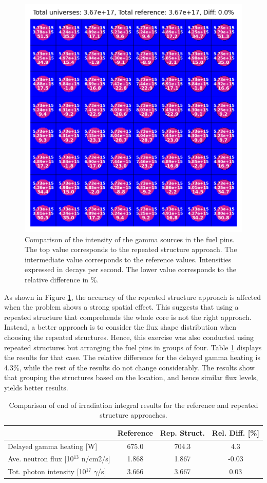 \begin{figure}[htbp!] %
    \centering
    \includegraphics[width=0.75\linewidth]{figures/moaa-ref-uni-gamma-intens-b}
    \hfill
    \caption{Comparison of the intensity of the gamma sources in the fuel pins. The top value corresponds to the repeated structure approach. The intermediate value corresponds to the reference values. Intensities expressed in decays per second. The lower value corresponds to the relative difference in \%.}
    \label{fig:gamma-sources}
\end{figure}

As shown in Figure \ref{fig:gamma-sources}, the accuracy of the repeated structure approach is affected when the problem shows a strong spatial effect.
This suggests that using a repeated structure that comprehends the whole core is not the right approach.
Instead, a better approach is to consider the flux shape distribution when choosing the repeated structures.
Hence, this exercise was also conducted using repeated structures but arranging the fuel pins in groups of four.
Table \ref{table:verif2} displays the results for that case.
The relative difference for the delayed gamma heating is 4.3\%, while the rest of the results do not change considerably.
The results show that grouping the structures based on the location, and hence similar flux levels, yields better results.

\begin{table}[!htb]
  \centering
  \caption{Comparison of end of irradiation integral results for the reference and repeated structure approaches.}
  \label{table:verif2}
  \begin{tabular}{l|cc|c}
  \toprule
                                           & Reference  & Rep. Struct. & Rel. Diff. [\%] \\ %
  \midrule
   Delayed gamma heating [W]               & 675.0       & 704.3       &  4.3  \\
   Ave. neutron flux [10$^{13}$ n/cm2/s]   & 1.868       & 1.867       & -0.03 \\
   Tot. photon intensity [10$^{17}$ $\gamma$/s] &  3.666 & 3.667       &  0.03 \\
  \bottomrule
  \end{tabular}
\end{table}

